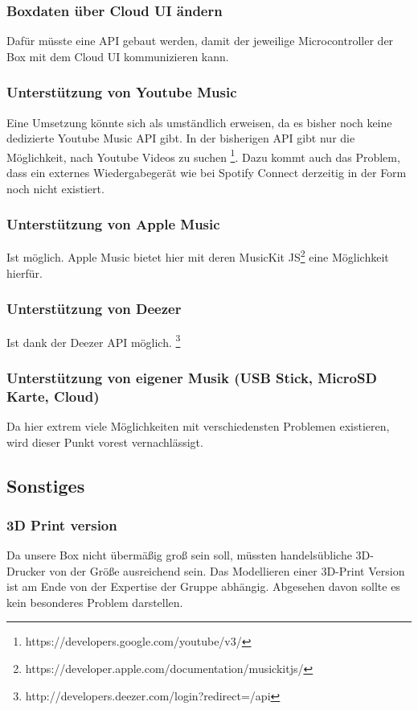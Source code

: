 \documentclass[10pt, a4paper, draft]{article}
\begin{document}
\subsubsection{Boxdaten über Cloud UI ändern}
Dafür müsste eine API gebaut werden, damit der jeweilige Microcontroller der Box mit dem Cloud UI kommunizieren kann.

\subsubsection{Unterstützung von Youtube Music}
Eine Umsetzung könnte sich als umständlich erweisen, da es bisher noch keine dedizierte Youtube Music API gibt. In der bisherigen API gibt nur die Möglichkeit, nach Youtube Videos zu suchen \footnote{https://developers.google.com/youtube/v3/}. Dazu kommt auch das Problem, dass ein externes Wiedergabegerät wie bei Spotify Connect derzeitig in der Form noch nicht existiert.
\subsubsection{Unterstützung von Apple Music}
Ist möglich. Apple Music bietet hier mit deren MusicKit JS\footnote{https://developer.apple.com/documentation/musickitjs/} eine Möglichkeit hierfür.
\subsubsection{Unterstützung von Deezer}
Ist dank der Deezer API möglich. \footnote{http://developers.deezer.com/login?redirect=/api}
\subsubsection{Unterstützung von eigener Musik (USB Stick, MicroSD Karte, Cloud)}
Da hier extrem viele Möglichkeiten mit verschiedensten Problemen existieren, wird dieser Punkt vorest vernachlässigt.

\subsection{Sonstiges}
\subsubsection{3D Print version}
Da unsere Box nicht übermäßig groß sein soll, müssten handelsübliche 3D-Drucker von der Größe ausreichend sein. Das Modellieren einer 3D-Print Version ist am Ende von der Expertise der Gruppe abhängig. Abgesehen davon sollte es kein besonderes Problem darstellen.
\end{document}
